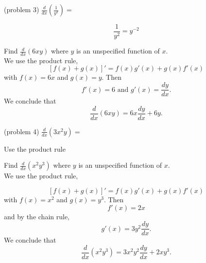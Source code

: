 \documentclass{ximera}
\begin{document}
\begin{problem}(problem 3)
  $\displaystyle{\frac{d}{dx} \left(\frac{1}{y^2}\right)=}$
 
\begin{multipleChoice}
\end{multipleChoice}
	  \begin{hint}
      \[\frac{1}{y^2} = y^{-2}\]
    \end{hint}
	
\end{problem}


\begin{example}[example 4]
Find $\frac{d}{dx} (6xy)$ where $y$ is an unspecified function of $x$.\\
We use the product rule,
\[\displaystyle{[f(x) + g(x)]' = f(x)g'(x) + g(x)f'(x)}\]
with $f(x) = 6x$ and $g(x) = y$. Then 
\[f'(x) = 6 \text{ and } g'(x) = \frac{dy}{dx}.\]
We conclude that
\[\frac{d}{dx} (6xy) = 6x \frac{dy}{dx} + 6y.\]
\end{example}



\begin{center}
\begin{foldable}
\end{foldable}
\end{center}


\begin{problem}(problem 4)
  $\displaystyle{\frac{d}{dx} \left(3x^2y\right)=}$
 
\begin{multipleChoice}
\end{multipleChoice}
	     
		\begin{hint}
      Use the product rule
    \end{hint}
 	
\end{problem}


\begin{example}[example 5]
Find $\frac{d}{dx} (x^2y^3)$ where $y$ is an unspecified function of $x$.\\
We use the product rule,

\[
[f(x) + g(x)]' = f(x)g'(x) + g(x)f'(x)
\]
with $f(x) = x^2$ and $g(x) = y^3$. Then 
\[f'(x) = 2x \]
and by the chain rule,
\[
g'(x) = 3y^2\frac{dy}{dx}.
\]
We conclude that
\[
\frac{d}{dx} (x^2y^3) = 3x^2y^2\frac{dy}{dx} + 2xy^3.
\]
\end{example}
\end{document}
